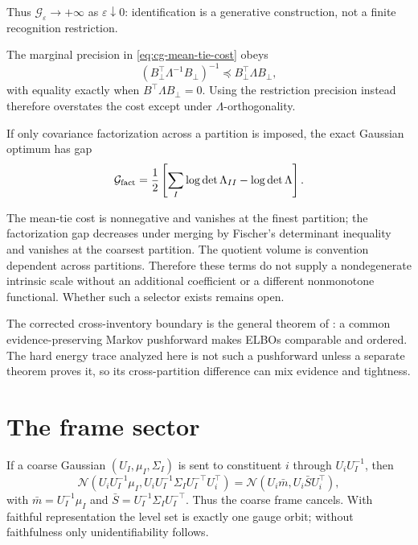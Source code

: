 Thus \(\mathcal G_\varepsilon\to+\infty\) as
\(\varepsilon\downarrow0\): identification is a generative construction, not
a finite recognition restriction.

The marginal precision in \eqref{eq:cg-mean-tie-cost} obeys
\begin{equation}
\left(B_\perp^\top\Lambda^{-1}B_\perp\right)^{-1}
\preceq B_\perp^\top\Lambda B_\perp,
\label{eq:cg-loewner}
\end{equation}
with equality exactly when
\(B^\top\Lambda B_\perp=0\). Using the restriction precision instead
therefore overstates the cost except under \(\Lambda\)-orthogonality.

If only covariance factorization across a partition is imposed, the exact
Gaussian optimum has gap
\begin{equation}
\mathcal G_{\rm fact}
=\frac12\left[
\sum_I\log\det\Lambda_{II}-\log\det\Lambda
\right].
\label{eq:cg-factorization-gap}
\end{equation}

The mean-tie cost is nonnegative and vanishes at the
finest partition; the factorization gap decreases under merging by Fischer's
determinant inequality and vanishes at the coarsest partition. The quotient
volume is convention dependent across partitions. Therefore these terms do
not supply a nondegenerate intrinsic scale without an additional coefficient
or a different nonmonotone functional. Whether such a selector exists remains
open. 

The corrected cross-inventory boundary is the general theorem of
: a common evidence-preserving Markov pushforward makes
ELBOs comparable and ordered. The hard energy trace analyzed here is not such
a pushforward unless a separate theorem proves it, so its cross-partition
difference can mix evidence and tightness. 

\section{The frame sector}
\label{sec:cg-frame}

If a coarse Gaussian \((U_I,\mu_I,\Sigma_I)\) is sent to constituent \(i\)
through \(U_iU_I^{-1}\), then
\begin{equation}
\mathcal N(U_iU_I^{-1}\mu_I,
U_iU_I^{-1}\Sigma_IU_I^{-\top}U_i^\top)
=\mathcal N(U_i\bar m,U_i\bar S U_i^\top),
\label{eq:cg-frame-cancellation}
\end{equation}
with \(\bar m=U_I^{-1}\mu_I\) and
\(\bar S=U_I^{-1}\Sigma_IU_I^{-\top}\).
Thus the coarse frame cancels. With faithful representation the level set is
exactly one gauge orbit; without faithfulness only unidentifiability follows.

